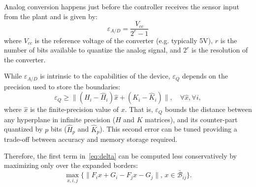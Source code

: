 Analog conversion happens just before the controller receives the sensor input from the plant
and is given by:
\begin{equation*}
\varepsilon_{A/D}=\frac{V_{cc}}{2^{r}-1}
\end{equation*}
where $V_{cc}$ is the reference voltage of the converter (e.g. typically 5V), $r$
is the number of bits available to quantize the analog signal, and $2^{r}$ is
the resolution of the converter.

While $\varepsilon_{A/D}$ is intrinsic to the capabilities of the device,
$\varepsilon_{Q}$ depends on the precision used to store the boundaries:
\begin{equation}\label{eq:quantizationlines}
  \varepsilon_{Q} \ge  \|(H_i - \hat{H}_i) \hat{x} + (K_i - \hat{K}_i)\|, \quad \forall \hat{x},\forall i,
\end{equation}
where $\hat{x}$ is the finite-precision value of $x$.
That is, $\varepsilon_{Q}$ bounds the distance between any hyperplane in infinite
precision ($H$ and $K$ matrices), and its counter-part quantized by $p$ bits 
($\hat{H}_{p}$ and $\hat{K}_{p}$).
This second error can be tuned providing a trade-off between accuracy and
memory storage required.

 Therefore, the first term in~\autoref{eq:delta} can be computed less conservatively by maximizing only over 
 the expanded borders:
 \begin{equation}
 \label{eq:maximization}
 \max_{x,i,j}\{\|F_ix+G_i-F_jx-G_j\|,\,x\in \bar{\mathcal B}_{ij}\}.
 \end{equation}
 

